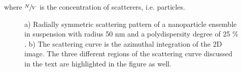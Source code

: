 where $\sfrac{N}{V}$ is the concentration of scatterers, i.e. particles.


\begin{figure}%
	\centering
		\qquad
\caption[The scattering curve and its relevant regions.]{a) Radially symmetric scattering pattern of a nanoparticle ensemble in suspension with radius 50 nm and a polydispersity degree of 25 $\%$. b) The scattering curve is the azimuthal integration of the 2D image. The three different regions of the scattering curve discussed in the text are highlighted in the figure as well.}
\end{figure}

